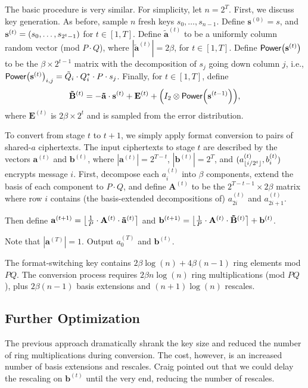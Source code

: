 \documentclass[../fheimpl.tex]{subfiles}
\begin{document}
The basic procedure is very similar. For simplicity, let $n=2^T$. First, we discuss key generation. 
As before, sample $n$ fresh keys $s_0, \ldots, s_{n-1}$. Define $\mathbf{s}^{(0)}=s$, and $\mathbf{s}^{(t)}=\parens*{s_0, \ldots, s_{2^t-1}}$ for $t\in[1,T]$.
Define $\mathbf{\tilde{a}}^{(t)}$ to be a uniformly column random vector (mod $P\cdot Q$), where $|\mathbf{\tilde{a}}^{(t)}| = 2\beta$, for $t\in[1,T]$.
Define $\mathsf{Power}\parens*{\mathbf{s}^{(t)}}$ to be the $\beta\times 2^{t-1}$ matrix with the decomposition of $s_j$ going down column $j$, i.e., $\mathsf{Power}\parens*{\mathbf{s}^{(t)}}_{i,j} = \tilde{Q}_{i}\cdot Q_{i}^*\cdot P\cdot s_j$. Finally, for $t\in[1,T]$, define
\[\mathbf{\tilde{B}}^{(t)} = -\mathbf{\tilde{a}}\cdot \mathbf{s}^{(t)} + \mathbf{E}^{(t)} + \parens*{I_2\otimes \mathsf{Power}\parens*{\mathbf{s}^{(t-1)}}},\]
where $\mathbf{E}^{(t)}$ is $2\beta\times 2^t$ and is sampled from the error distribution.


To convert from stage $t$ to $t+1$, we simply apply format conversion to pairs of shared-$a$ ciphertexts.
The input ciphertexts to stage $t$ are described by the vectors $\mathbf{a}^{(t)}$ and $\mathbf{b}^{(t)}$, where $|\mathbf{a}^{(t)}|=2^{T-t}$, $|\mathbf{b}^{(t)}|=2^T$, and $(a^{(t)}_{\floor{i/2^t}}, b^{(t)}_i)$ encrypts message $i$. First, decompose each $a^{(t)}_i$ into $\beta$ components, extend the basis of each component to $P\cdot Q$, and define $\mathbf{A}^{(t)}$ to be the $2^{T-t-1}\times 2\beta$ matrix where row $i$ contains (the basis-extended decompositions of) $a^{(t)}_{2i}$ and $a^{(t)}_{2i+1}$.

Then define $\mathbf{a}^{(t+1)} = \round*{\frac{1}{P}\cdot \mathbf{A}^{(t)}\cdot \mathbf{\tilde{a}}^{(t)}}$ and $\mathbf{b}^{(t+1)} = \round*{\frac{1}{P}\cdot \mathbf{A}^{(t)}\cdot \mathbf{\tilde{B}}^{(t)}} + \mathbf{b}^{(t)}$.

Note that $|\mathbf{a}^{(T)}|=1$. Output $a^{(T)}_0$ and $\mathbf{b}^{(t)}$.

The format-switching key contains $2\beta \log(n)+4\beta(n-1)$ ring elements mod $PQ$. The conversion process requires $2\beta n\log(n)$ ring multiplications (mod $PQ$), plus $2\beta(n-1)$ basis extensions and $(n+1)\log(n)$ rescales.

\subsection{Further Optimization}
The previous approach dramatically shrank the key size and reduced the number of ring multiplications during conversion. The cost, however, is an increased number of basis extensions and rescales. Craig pointed out that we could delay the rescaling on $\mathbf{b}^{(t)}$ until the very end, reducing the number of rescales.
\end{document}
